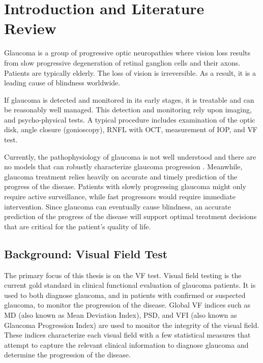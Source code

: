 \chapter{Introduction and Literature Review}

Glaucoma is a group of progressive optic neuropathies where vision loss results from slow progressive degeneration of retinal ganglion cells and their axons. \cite{Weinreb2004} Patients are typically elderly. The loss of vision is irreversible. As a result, it is a leading cause of blindness worldwide. 

If glaucoma is detected and monitored in its early stages, it is treatable and can be reasonably well managed. This detection and monitoring rely upon imaging, and psycho-physical tests. A typical procedure includes examination of the optic disk, angle closure (gonioscopy), \ac{RNFL} with \ac{OCT}, measurement of \ac{IOP}, and \acl{VF} test.

Currently, the pathophysiology of glaucoma is not well understood and there are no models that can robustly characterize glaucoma progression \cite{Chen2014}. Meanwhile, glaucoma treatment relies heavily on accurate and timely prediction of the progress of the disease. Patients with slowly progressing glaucoma might only require active surveillance, while fast progressors would require immediate intervention. Since glaucoma can eventually cause blindness, an accurate prediction of the progress of the disease will support optimal treatment decisions that are critical for the patient's quality of life.  

\section{Background: Visual Field Test}

The primary focus of this thesis is on the \acl{VF} test. Visual field testing is the current gold standard in clinical functional evaluation of glaucoma patients. It is used to both diagnose glaucoma, and in patients with confirmed or suspected glaucoma, to monitor the progression of the disease. Global \acl{VF} indices such as \ac{MD} (also known as Mean Deviation Index), \ac{PSD}, and \ac{VFI} (also known as Glaucoma Progression Index) are used to monitor the integrity of the visual field. These indices characterize each visual field with a few statistical measures that attempt to capture the relevant clinical information to diagnose glaucoma and determine the progression of the disease. 

